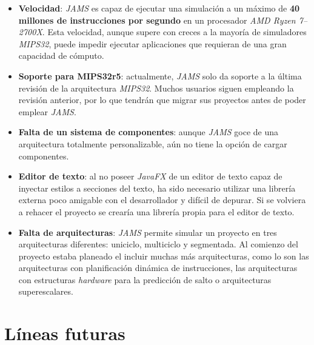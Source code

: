\begin{itemize}
    \item \textbf{Velocidad}: \textit{JAMS} es capaz de ejecutar
    una simulación a un máximo de \textbf{40 millones de instrucciones por segundo} en un
    procesador \textit{AMD Ryzen 7--2700X}.
    Esta velocidad, aunque supere con creces a la mayoría de simuladores \textit{MIPS32},
    puede impedir ejecutar aplicaciones que requieran de una gran capacidad de cómputo.
    \item \textbf{Soporte para MIPS32r5}: actualmente, \textit{JAMS} solo da soporte
    a la última revisión de la arquitectura \textit{MIPS32}.
    Muchos usuarios siguen empleando la revisión anterior, por lo que tendrán que migrar
    sus proyectos antes de poder emplear \textit{JAMS}.
    \item \textbf{Falta de un sistema de componentes}: aunque \textit{JAMS}
    goce de una arquitectura totalmente personalizable,
    aún no tiene la opción de cargar componentes.
    \item \textbf{Editor de texto}: al no poseer \textit{JavaFX} de un editor
    de texto capaz de inyectar estilos a secciones del texto, ha sido necesario
    utilizar una librería externa poco amigable con el desarrollador y difícil
    de depurar.
    Si se volviera a rehacer el proyecto se crearía una librería propia para
    el editor de texto.
    \item \textbf{Falta de arquitecturas}: \textit{JAMS} permite simular
    un proyecto en tres arquitecturas diferentes: uniciclo, multiciclo y segmentada.
    Al comienzo del proyecto estaba planeado el incluir muchas más arquitecturas,
    como lo son las arquitecturas con planificación dinámica de instrucciones,
    las arquitecturas con estructuras \textit{hardware} para la predicción de salto
    o arquitecturas superescalares.
\end{itemize}

\section{Líneas futuras}\label{sec:líneas-futuras}

